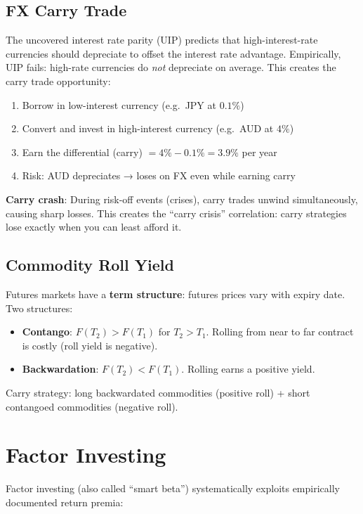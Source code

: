 \documentclass[12pt,a4paper,openany]{report}
\theoremstyle{definition}
\begin{document}
\subsection{FX Carry Trade}

The uncovered interest rate parity (UIP) predicts that high-interest-rate currencies should depreciate to offset the interest rate advantage. Empirically, UIP fails: high-rate currencies do \emph{not} depreciate on average. This creates the carry trade opportunity:

\begin{enumerate}[label=\arabic*.]
  \item Borrow in low-interest currency (e.g.\ JPY at $0.1\%$)
  \item Convert and invest in high-interest currency (e.g.\ AUD at $4\%$)
  \item Earn the differential (carry) $= 4\% - 0.1\% = 3.9\%$ per year
  \item Risk: AUD depreciates → loses on FX even while earning carry
\end{enumerate}

\textbf{Carry crash}: During risk-off events (crises), carry trades unwind simultaneously, causing sharp losses. This creates the ``carry crisis'' correlation: carry strategies lose exactly when you can least afford it.

\subsection{Commodity Roll Yield}

Futures markets have a \textbf{term structure}: futures prices vary with expiry date. Two structures:
\begin{itemize}
  \item \textbf{Contango}: $F(T_2) > F(T_1)$ for $T_2 > T_1$. Rolling from near to far contract is costly (roll yield is negative).
  \item \textbf{Backwardation}: $F(T_2) < F(T_1)$. Rolling earns a positive yield.
\end{itemize}
Carry strategy: long backwardated commodities (positive roll) + short contangoed commodities (negative roll).

\section{Factor Investing}

Factor investing (also called ``smart beta'') systematically exploits empirically documented return premia:
\end{document}
